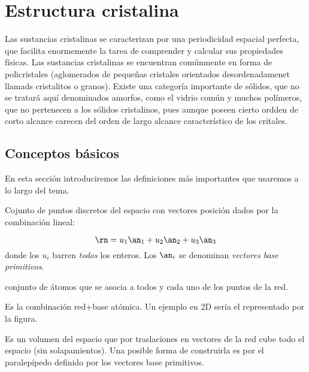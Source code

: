 \chapter{Estructura cristalina}

Las sustancias cristalinas se caracterizan por una periodicidad espacial perfecta, que facilita enormemente la tarea de comprender y calcular sus propiedades físicas. Las sustancias cristalinas se encuentran comúnmente en forma de policristales (aglomerados de pequeñas cristales orientados desordenadamenet llamads cristalitos o granos). Existe una categoría importante de sólidos, que no se tratará aquí denominados amorfos, como el vidrio común  y muchos polímeros, que no pertenecen a los sólidos cristalinos, pues aunque poseen cierto ordden de corto alcance carecen del orden de largo alcance característico de los critales.

\section{Conceptos básicos}

En esta sección introduciremos las definiciones más importantes que usaremos a lo largo del tema. \\

\begin{definition}[{\bf Red}]
    Cojunto de puntos discretos del espacio con vectores posición dados por la combinación lineal: 

    \begin{equation}
        \rn = u_1 \an_1 + u_2 \an_2 + u_3 \an_3 \label{Ec:01-01-01}
    \end{equation}
    donde los $u_i$ barren {\it todos} los enteros. Los $\an_i$ se denominan {\it vectores base primitivos}.
\end{definition}

\begin{definition}
    conjunto de átomos que se asocia a todos y cada uno de los puntos de la red.
\end{definition}

\begin{definition}
    Es la combinación red+base atómica. Un ejemplo en 2D sería el representado por la figura.
\end{definition}

\begin{definition}
    Es un volumen del espacio que por traslaciones en vectores de la red cube todo el espacio (sin solapamientos). Una posible forma de construirla es por el paralepípedo definido por los vectores base primitivos.    
\end{definition}

